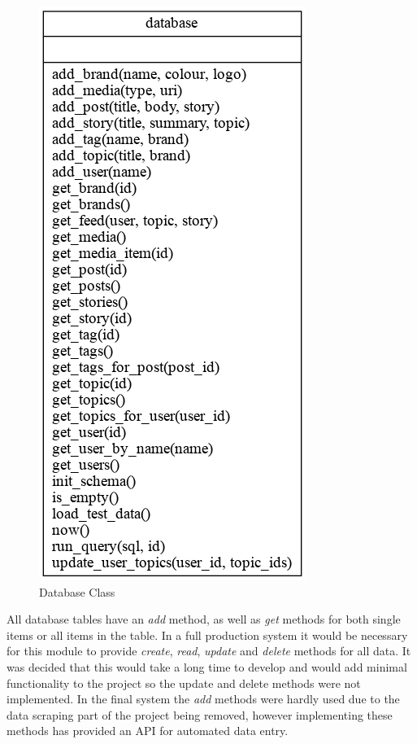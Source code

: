 \documentclass[12pt,titlepage]{article}
\begin{document}
  \begin{figure}
    \centering
    \includegraphics[height=\textheight/3]{../img/catalogue.png}
    \caption{Database Class}
    \label{fig:catalogue}
  \end{figure}

  All database tables have an \textit{add} method, as well as \textit{get}
  methods for both single items or all items in the table. In a full production
  system it would be necessary for this module to provide \textit{create},
  \textit{read}, \textit{update} and \textit{delete} methods for all data. It
  was decided that this would take a long time to develop and would add minimal
  functionality to the project so the update and delete methods were not
  implemented. In the final system the \textit{add} methods were hardly used due
  to the data scraping part of the project being removed, however implementing
  these methods has provided an API for automated data entry.
\end{document}
